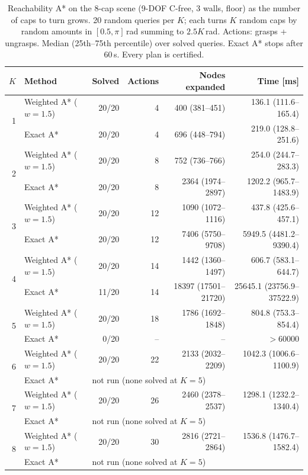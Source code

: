 \begin{table}[t]
\centering
\caption{Reachability A* on the 8-cap scene (9-DOF C-free, 3 walls, floor) as the number of caps to
turn grows. 20 random queries per $K$; each turns $K$ random caps by random amounts in
$[0.5,\pi]$\,rad summing to $2.5K$\,rad. Actions: grasps + ungrasps. Median (25th--75th
percentile) over solved queries. Exact A* stops after 60\,s. Every plan is certified.}
\label{tab:cap_scaling}
\setlength{\tabcolsep}{3.5pt}
\begin{tabular}{@{}r l r r r r@{}}
\toprule
$K$ & Method & Solved & Actions & Nodes expanded & Time [ms]\\
\midrule
\multirow{2}{*}{1} & Weighted A* ($w=1.5$) & 20/20 & 4 & 400 (381--451) & 136.1 (111.6--165.4)\\
 & Exact A* & 20/20 & 4 & 696 (448--794) & 219.0 (128.8--251.6)\\
\midrule
\multirow{2}{*}{2} & Weighted A* ($w=1.5$) & 20/20 & 8 & 752 (736--766) & 254.0 (244.7--283.3)\\
 & Exact A* & 20/20 & 8 & 2364 (1974--2897) & 1202.2 (965.7--1483.9)\\
\midrule
\multirow{2}{*}{3} & Weighted A* ($w=1.5$) & 20/20 & 12 & 1090 (1072--1116) & 437.8 (425.6--457.1)\\
 & Exact A* & 20/20 & 12 & 7406 (5750--9708) & 5949.5 (4481.2--9390.4)\\
\midrule
\multirow{2}{*}{4} & Weighted A* ($w=1.5$) & 20/20 & 14 & 1442 (1360--1497) & 606.7 (583.1--644.7)\\
 & Exact A* & 11/20 & 14 & 18397 (17501--21720) & 25645.1 (23756.9--37522.9)\\
\midrule
\multirow{2}{*}{5} & Weighted A* ($w=1.5$) & 20/20 & 18 & 1786 (1692--1848) & 804.8 (753.3--854.4)\\
 & Exact A* & 0/20 & -- & -- & $>$60000\\
\midrule
\multirow{2}{*}{6} & Weighted A* ($w=1.5$) & 20/20 & 22 & 2133 (2032--2209) & 1042.3 (1006.6--1100.9)\\
 & Exact A* & \multicolumn{4}{l}{not run (none solved at $K=5$)}\\
\midrule
\multirow{2}{*}{7} & Weighted A* ($w=1.5$) & 20/20 & 26 & 2460 (2378--2537) & 1298.1 (1232.2--1340.4)\\
 & Exact A* & \multicolumn{4}{l}{not run (none solved at $K=5$)}\\
\midrule
\multirow{2}{*}{8} & Weighted A* ($w=1.5$) & 20/20 & 30 & 2816 (2721--2864) & 1536.8 (1476.7--1582.4)\\
 & Exact A* & \multicolumn{4}{l}{not run (none solved at $K=5$)}\\
\bottomrule
\end{tabular}
\end{table}
